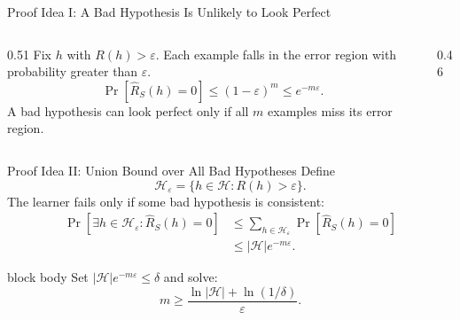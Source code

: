 \documentclass[aspectratio=169,10pt]{beamer}
\newcommand{\Hc}{\mathcal{H}}
\newcommand{\eps}{\varepsilon}
\begin{document}
\begin{frame}[t]{Proof Idea I: A Bad Hypothesis Is Unlikely to Look Perfect}
  \vspace{0.02cm}
  \begin{columns}[T,totalwidth=\textwidth]
    \begin{column}{0.51\textwidth}
      Fix $h$ with $R(h)>\eps$. Each example falls in the error region with probability greater than $\eps$.
      \vspace{0.10cm}
      \[
        \Pr\!\left[\widehat R_S(h)=0\right]
        \le (1-\eps)^m
        \le e^{-m\eps}.
      \]
      A bad hypothesis can look perfect only if all $m$ examples miss its error region.
    \end{column}
    \begin{column}{0.46\textwidth}
      \centering
    \end{column}
  \end{columns}
\end{frame}

\begin{frame}[t]{Proof Idea II: Union Bound over All Bad Hypotheses}
  \vspace{0.02cm}
  Define
  \[
    \Hc_{\eps}=\{h\in\Hc:R(h)>\eps\}.
  \]
  The learner fails only if some bad hypothesis is consistent:
  \begin{align*}
    \Pr\!\left[\exists h\in\Hc_{\eps}:\widehat R_S(h)=0\right]
    &\le \sum_{h\in\Hc_{\eps}}\Pr\!\left[\widehat R_S(h)=0\right] \\
    &\le |\Hc|e^{-m\eps}.
  \end{align*}
  \vspace{-0.12cm}
  \begin{beamercolorbox}[rounded=true,sep=0.08cm,wd=0.88\linewidth,center]{block body}
    Set $|\Hc|e^{-m\eps}\le\delta$ and solve:
    \[
      m\ge\frac{\ln|\Hc|+\ln(1/\delta)}{\eps}.
    \]
  \end{beamercolorbox}
\end{frame}
\end{document}
